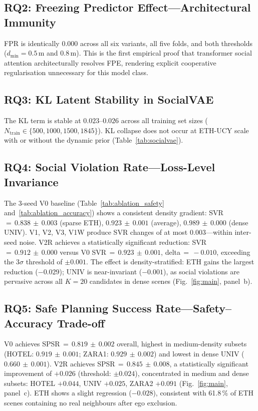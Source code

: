 \documentclass[journal]{IEEEtran}
\begin{document}
\subsection{RQ2: Freezing Predictor Effect---Architectural Immunity}

FPR is identically 0.000 across all six variants, all five
folds, and both thresholds ($d_\text{min}{=}0.5$\,m and $0.8$\,m).
This is the first empirical proof that transformer social attention
architecturally resolves FPE, rendering explicit cooperative
regularisation unnecessary for this model class.

\subsection{RQ3: KL Latent Stability in SocialVAE}

The KL term is stable at $0.023$--$0.026$ across all training set
sizes ($N_\text{train}\in\{500,1000,1500,1845\}$).
KL collapse does not occur at ETH-UCY scale with or without the
dynamic prior (Table~\ref{tab:socialvae}).

\subsection{RQ4: Social Violation Rate---Loss-Level Invariance}

The 3-seed V0 baseline (Table~\ref{tab:ablation_safety} and~\ref{tab:ablation_accuracy}) shows a consistent
density gradient: SVR\,\(=\,0.838\,\pm\,0.003\) (sparse ETH),
$0.923\,\pm\,0.001$ (average), $0.989\,\pm\,0.000$ (dense UNIV).
V1, V2, V3, V1W produce SVR changes of at most $0.003$---within
inter-seed noise.
V2R achieves a statistically significant reduction: SVR\,\(=\,0.912\,\pm\,0.000\)
versus V0 SVR\,\(=\,0.923\,\pm\,0.001\), delta\,\(=\,-0.010\),
exceeding the $3\sigma$ threshold of $\pm0.001$.
The effect is density-stratified: ETH gains the largest reduction
($-0.029$); UNIV is near-invariant ($-0.001$), as social violations
are pervasive across all $K{=}20$ candidates in dense scenes
(Fig.~\ref{fig:main}, panel~b).

\subsection{RQ5: Safe Planning Success Rate---Safety--Accuracy Trade-off}

V0 achieves SPSR\,\(=\,0.819\,\pm\,0.002\) overall, highest in
medium-density subsets (HOTEL: $0.919\,\pm\,0.001$;
ZARA1: $0.929\,\pm\,0.002$) and lowest in dense UNIV
($0.660\,\pm\,0.001$).
V2R achieves SPSR\,\(=\,0.845\,\pm\,0.008\), a statistically
significant improvement of $+0.026$ (threshold: $\pm0.024$),
concentrated in medium and dense subsets: HOTEL $+0.044$,
UNIV $+0.025$, ZARA2 $+0.091$ (Fig.~\ref{fig:main}, panel~c).
ETH shows a slight regression ($-0.028$), consistent with
61.8\,\% of ETH scenes containing no real neighbours after ego
exclusion.
\end{document}
